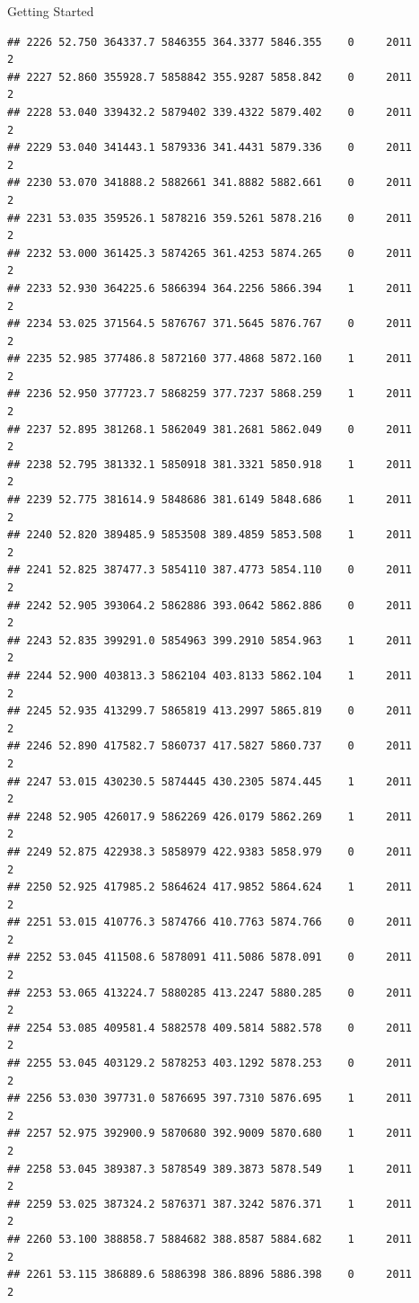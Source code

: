 \documentclass[
  ignorenonframetext,
]{beamer}
\begin{document}
\begin{frame}[fragile]{Getting Started}
\begin{verbatim}
## 2226 52.750 364337.7 5846355 364.3377 5846.355    0     2011        2
## 2227 52.860 355928.7 5858842 355.9287 5858.842    0     2011        2
## 2228 53.040 339432.2 5879402 339.4322 5879.402    0     2011        2
## 2229 53.040 341443.1 5879336 341.4431 5879.336    0     2011        2
## 2230 53.070 341888.2 5882661 341.8882 5882.661    0     2011        2
## 2231 53.035 359526.1 5878216 359.5261 5878.216    0     2011        2
## 2232 53.000 361425.3 5874265 361.4253 5874.265    0     2011        2
## 2233 52.930 364225.6 5866394 364.2256 5866.394    1     2011        2
## 2234 53.025 371564.5 5876767 371.5645 5876.767    0     2011        2
## 2235 52.985 377486.8 5872160 377.4868 5872.160    1     2011        2
## 2236 52.950 377723.7 5868259 377.7237 5868.259    1     2011        2
## 2237 52.895 381268.1 5862049 381.2681 5862.049    0     2011        2
## 2238 52.795 381332.1 5850918 381.3321 5850.918    1     2011        2
## 2239 52.775 381614.9 5848686 381.6149 5848.686    1     2011        2
## 2240 52.820 389485.9 5853508 389.4859 5853.508    1     2011        2
## 2241 52.825 387477.3 5854110 387.4773 5854.110    0     2011        2
## 2242 52.905 393064.2 5862886 393.0642 5862.886    0     2011        2
## 2243 52.835 399291.0 5854963 399.2910 5854.963    1     2011        2
## 2244 52.900 403813.3 5862104 403.8133 5862.104    1     2011        2
## 2245 52.935 413299.7 5865819 413.2997 5865.819    0     2011        2
## 2246 52.890 417582.7 5860737 417.5827 5860.737    0     2011        2
## 2247 53.015 430230.5 5874445 430.2305 5874.445    1     2011        2
## 2248 52.905 426017.9 5862269 426.0179 5862.269    1     2011        2
## 2249 52.875 422938.3 5858979 422.9383 5858.979    0     2011        2
## 2250 52.925 417985.2 5864624 417.9852 5864.624    1     2011        2
## 2251 53.015 410776.3 5874766 410.7763 5874.766    0     2011        2
## 2252 53.045 411508.6 5878091 411.5086 5878.091    0     2011        2
## 2253 53.065 413224.7 5880285 413.2247 5880.285    0     2011        2
## 2254 53.085 409581.4 5882578 409.5814 5882.578    0     2011        2
## 2255 53.045 403129.2 5878253 403.1292 5878.253    0     2011        2
## 2256 53.030 397731.0 5876695 397.7310 5876.695    1     2011        2
## 2257 52.975 392900.9 5870680 392.9009 5870.680    1     2011        2
## 2258 53.045 389387.3 5878549 389.3873 5878.549    1     2011        2
## 2259 53.025 387324.2 5876371 387.3242 5876.371    1     2011        2
## 2260 53.100 388858.7 5884682 388.8587 5884.682    1     2011        2
## 2261 53.115 386889.6 5886398 386.8896 5886.398    0     2011        2

\end{verbatim}
\end{frame}
\end{document}
